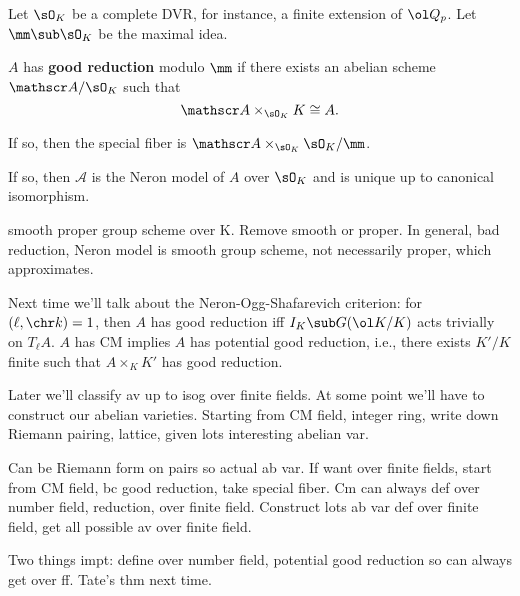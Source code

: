 Let $\sO_K$ be a complete DVR, for instance, a finite extension of $\ol Q_p$. Let $\mm\sub \sO_K$ be the maximal idea.
\begin{df}
$A$ has \textbf{good reduction} modulo $\mm$ if there exists an abelian scheme $\mathscr A/\sO_K$ such that 
\[
\mathscr A\times_{\sO_K}K\cong A.
\]
\end{df}
If so, then the special fiber is $\mathscr A\times_{\sO_K} \sO_K/\mm$.
\begin{rem}
If so, then $\mathscr A$ is the Neron model of $A$ over $\sO_K$ and is unique up to canonical isomorphism.

smooth proper group scheme over K. Remove smooth or proper. In general, bad reduction, Neron model is smooth group scheme, not necessarily proper, which approximates.
\end{rem}
Next time we'll talk about the Neron-Ogg-Shafarevich criterion: for $(\ell,\chr k)=1$, then $A$ has good reduction iff $I_K\sub G(\ol K/K)$ acts trivially on $T_{\ell}A$. $A$ has CM implies $A$ has potential good reduction, i.e., there exists $K'/K$ finite such that $A\times_K K'$ has good reduction.

Later we'll classify av up to isog over finite fields. At some point we'll have to construct our abelian varieties. Starting from CM field, integer ring, write down Riemann pairing, lattice, given lots interesting abelian var.

Can be Riemann form on pairs so actual ab var. If want over finite fields, start from CM field, bc good reduction, take special fiber. Cm can always def over number field, reduction, over finite field. Construct lots ab var def over finite field, get all possible av over finite field. 

Two things impt: define over number field, potential good reduction so can always get over ff. Tate's thm next time.